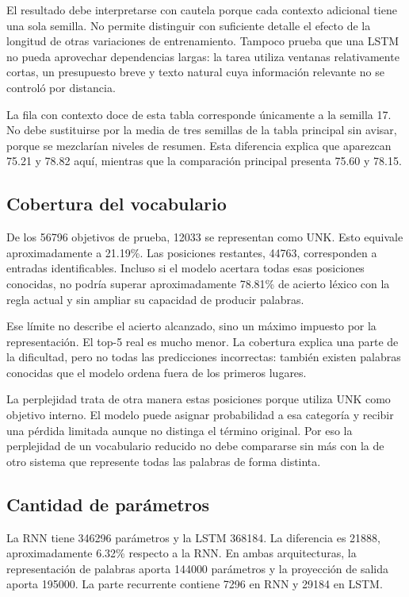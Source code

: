 El resultado debe interpretarse con cautela porque cada contexto adicional tiene una sola semilla. No permite distinguir con suficiente detalle el efecto de la longitud de otras variaciones de entrenamiento. Tampoco prueba que una LSTM no pueda aprovechar dependencias largas: la tarea utiliza ventanas relativamente cortas, un presupuesto breve y texto natural cuya información relevante no se controló por distancia.

La fila con contexto doce de esta tabla corresponde únicamente a la semilla 17. No debe sustituirse por la media de tres semillas de la tabla principal sin avisar, porque se mezclarían niveles de resumen. Esta diferencia explica que aparezcan 75.21 y 78.82 aquí, mientras que la comparación principal presenta 75.60 y 78.15.

\subsection{Cobertura del vocabulario}
De los 56796 objetivos de prueba, 12033 se representan como UNK. Esto equivale aproximadamente a 21.19\%. Las posiciones restantes, 44763, corresponden a entradas identificables. Incluso si el modelo acertara todas esas posiciones conocidas, no podría superar aproximadamente 78.81\% de acierto léxico con la regla actual y sin ampliar su capacidad de producir palabras.

Ese límite no describe el acierto alcanzado, sino un máximo impuesto por la representación. El top-5 real es mucho menor. La cobertura explica una parte de la dificultad, pero no todas las predicciones incorrectas: también existen palabras conocidas que el modelo ordena fuera de los primeros lugares.

La perplejidad trata de otra manera estas posiciones porque utiliza UNK como objetivo interno. El modelo puede asignar probabilidad a esa categoría y recibir una pérdida limitada aunque no distinga el término original. Por eso la perplejidad de un vocabulario reducido no debe compararse sin más con la de otro sistema que represente todas las palabras de forma distinta.

\subsection{Cantidad de parámetros}
La RNN tiene 346296 parámetros y la LSTM 368184. La diferencia es 21888, aproximadamente 6.32\% respecto a la RNN. En ambas arquitecturas, la representación de palabras aporta 144000 parámetros y la proyección de salida aporta 195000. La parte recurrente contiene 7296 en RNN y 29184 en LSTM.

